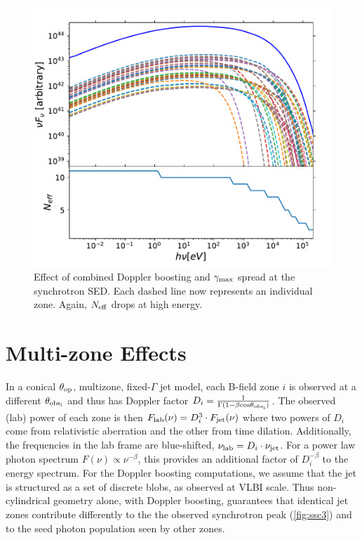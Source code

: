 \begin{figure}[t]
\includegraphics[width=0.8\linewidth]{figures/Figure4.pdf}
\centering
\caption{Effect of combined Doppler boosting and $\gamma_{\rm max}$ spread at the synchrotron SED. Each dashed line now represents an individual zone.  Again, $N_{\rm eff}$ drops at high energy.}
\label{fig:ssc4}
\end{figure}

\section{Multi-zone Effects}

In a conical $\theta_{\rm op}$, multizone, fixed-$\Gamma$ jet model, each B-field zone $i$ is observed at a different $\theta_{\rm obs_i}$ and thus has Doppler factor $D_i = \frac{1}{\Gamma(1-\beta {\rm cos}\theta_{\rm obs_i})}$. The observed (lab) power of each zone is then $F_{\rm lab}(\nu) = D_i^3 \cdot F_{\rm jet}(\nu)$ where two powers of $D_i$ come from relativistic aberration and the other from time dilation. Additionally, the frequencies in the lab frame are blue-shifted, $\nu_{\rm lab} = D_i\cdot \nu_{\rm jet}$. For a power law photon spectrum $F(\nu) \propto \nu^{-\beta}$, this provides an additional factor of $D_i^{-\beta}$ to the energy spectrum. 
For the Doppler boosting computations, we assume that the jet is structured as a set of discrete blobs, as observed at VLBI scale. 
Thus non-cylindrical geometry alone, with Doppler boosting, guarantees that identical jet zones contribute differently to the the observed synchrotron peak (\cref{fig:ssc3}) and to the seed photon population seen by other zones. 


